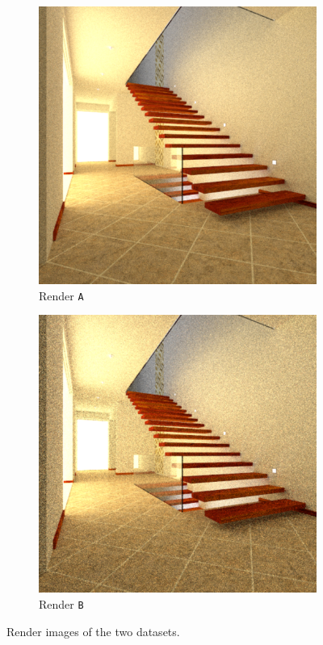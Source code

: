 \begin{figure}
	\centering
	\begin{subfigure}[t]{0.32\linewidth}
		\includegraphics[width=\textwidth]{chapters/chapter_results/a_render.pdf}
		\caption{Render \texttt{A}}
	\end{subfigure}
	\begin{subfigure}[t]{0.32\linewidth}
		\includegraphics[width=\textwidth]{chapters/chapter_results/b_render.pdf}
		\caption{Render \texttt{B}}
	\end{subfigure}

	\caption{Render images of the two datasets.}
	\label{couple1render}
\end{figure}


